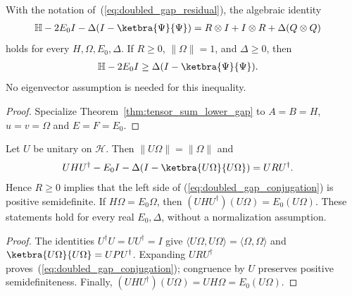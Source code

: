 \begin{theorem}
    \label{thm:doubled_lower_gap}
    \leanok
    With the notation of~(\ref{eq:doubled_gap_residual}), the algebraic identity
    \begin{align}
        \mathbb H-2E_0I-\Delta(I-\ketbra{\Psi}{\Psi})
            &=R\otimes I+I\otimes R+\Delta(Q\otimes Q)
        \label{eq:doubled_gap_decomposition}
    \end{align}
    holds for every $H,\Omega,E_0,\Delta$.
    If $R\ge0$, $\|\Omega\|=1$, and $\Delta\ge0$, then
    \begin{align}
        \mathbb H-2E_0I&\ge\Delta(I-\ketbra{\Psi}{\Psi}).
        \label{eq:doubled_gap_bound}
    \end{align}
    No eigenvector assumption is needed for this inequality.
\end{theorem}
\begin{proof}\leanok
    Specialize Theorem~\ref{thm:tensor_sum_lower_gap} to
    $A=B=H$, $u=v=\Omega$ and $E=F=E_0$.
\end{proof}

\begin{theorem}
    \label{thm:doubled_unitary_transport}
    \leanok
    Let $U$ be unitary on $\mathcal H$. Then $\|U\Omega\|=\|\Omega\|$ and
    \begin{align}
        UHU^\dagger-E_0I-\Delta(I-\ketbra{U\Omega}{U\Omega})
            &=URU^\dagger.
        \label{eq:doubled_gap_conjugation}
    \end{align}
    Hence $R\ge0$ implies that the left side of
    (\ref{eq:doubled_gap_conjugation}) is positive semidefinite.
    If $H\Omega=E_0\Omega$, then
    $(UHU^\dagger)(U\Omega)=E_0(U\Omega)$.
    These statements hold for every real $E_0,\Delta$, without a
    normalization assumption.
\end{theorem}
\begin{proof}\leanok
    The identities $U^\dagger U=UU^\dagger=I$ give
    $\langle U\Omega,U\Omega\rangle=\langle\Omega,\Omega\rangle$ and
    $\ketbra{U\Omega}{U\Omega}=UPU^\dagger$.
    Expanding $URU^\dagger$ proves~(\ref{eq:doubled_gap_conjugation});
    congruence by $U$ preserves positive semidefiniteness. Finally,
    $(UHU^\dagger)(U\Omega)=UH\Omega=E_0(U\Omega)$.
\end{proof}

